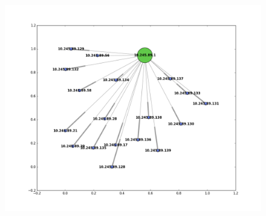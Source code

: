 \begin{figure}[htbp]
\hspace*{-2cm}                                                           
\includegraphics[scale=0.6]{imagenes/analisisTCORPcableada/cableada-12.png} 
\end{figure}








